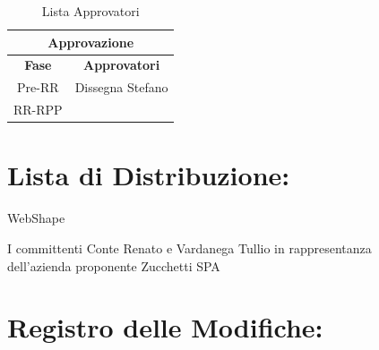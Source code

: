 \begin{table}[!h]
	\begin{center}
		\begin{tabular}
			{|c|c|}
			\hline
			\multicolumn{2}{|c|}{ \textbf{Approvazione} } \\
			\hline
			\textbf{Fase} & \textbf{Approvatori} \\
			\hline
			{Pre-RR} &  Dissegna Stefano \\
			\hline
			{RR-RPP} & \\
			\hline
		\end{tabular}
		\caption{Lista Approvatori} %
		\label{tabapprovazione}
	\end{center}
\end{table}
\textbf{}

\section*{\LARGE Lista di Distribuzione:}

	\begin{elenconumerato}{\normindent}
		\item WebShape 
     	\item I committenti Conte Renato e Vardanega Tullio in rappresentanza \\  dell'azienda proponente Zucchetti SPA
	\end{elenconumerato}

\newpage


\section*{\LARGE Registro delle Modifiche:}

